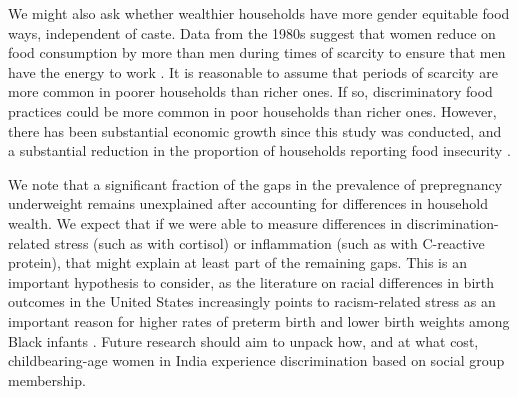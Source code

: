 We might also ask whether wealthier households have more gender equitable food ways, independent of caste.  Data from the 1980s suggest that women reduce on food consumption by more than men during times of scarcity to ensure that men have the energy to work \citep{behrman1990intrahousehold}.  It is reasonable to assume that periods of scarcity are more common in poorer households than richer ones.  If so, discriminatory food practices could be more common in poor households than richer ones.  However, there has been substantial economic growth since this study was conducted, and a substantial reduction in the proportion of households reporting food insecurity \citep{deaton2009food}. 

We note that a significant fraction of the gaps in the prevalence of prepregnancy underweight remains unexplained after accounting for differences in household wealth.  We expect that if we were able to measure differences in discrimination-related stress (such as with cortisol) or inflammation (such as with C-reactive protein), that might explain at least part of the remaining gaps.  This is an important hypothesis to consider, as the literature on racial differences in birth outcomes in the United States increasingly points to racism-related stress as an important reason for higher rates of preterm birth and lower birth weights among Black infants \citep{hogue2005stress, braveman2015role, sosnaud2021cross}. Future research should aim to unpack how, and at what cost, childbearing-age women in India experience discrimination based on social group membership.  

